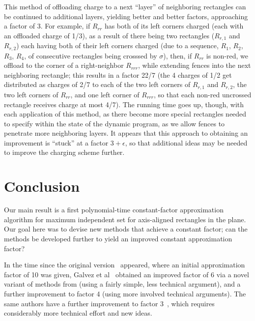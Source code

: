 \documentclass{article}
\begin{document}
This method of offloading charge to a next ``layer'' of neighboring
rectangles can be continued to additional layers, yielding better and
better factors, approaching a factor of 3. For example, if $R_{rr}$
has both of its left corners charged (each with an offloaded charge of
1/3), as a result of there being two rectangles ($R_{r,1}$ and
$R_{r,2}$) each having both of their left corners charged (due to a
sequence, $R_1$, $R_2$, $R_3$, $R_4$, of consecutive rectangles being
crosssed by $\sigma$), then, if $R_{rr}$ is non-red, we offload to the
corner of a right-neighbor $R_{rrr}$, while extending fences into the
next neighboring rectangle; this results in a factor 22/7 (the 4
charges of 1/2 get distributed as charges of 2/7 to each of the two
left corners of $R_{r,1}$ and $R_{r,2}$, the two left corners of
$R_{rr}$, and one left corner of $R_{rrr}$, so that each non-red
uncrossed rectangle receives charge at most 4/7). The running time
goes up, though, with each application of this method, as there become
more special rectangles needed to specify within the state of the
dynamic program, as we allow fences to penetrate more neighboring
layers. It appears that this approach to obtaining an improvement is
``stuck'' at a factor $3+\epsilon$, so that additional ideas may be
needed to improve the charging scheme further.

\section{Conclusion}

Our main result is a first polynomial-time constant-factor
approximation algorithm for maximum independent set for axis-aligned
rectangles in the plane.  Our goal here was to devise new methods that
achieve a constant factor; can the methods be developed further to
yield an improved constant approximation factor?

In the time since the original
version~\cite{DBLP:journals/corr/abs-2101-00326} appeared, where an
initial approximation factor of 10 was given, Galvez et
al~\cite{galvez20214approximation} obtained an improved factor of 6
via a novel variant of methods from
\cite{DBLP:journals/corr/abs-2101-00326} (using a fairly simple, less
technical argument), and a further improvement to factor 4 (using more
involved technical arguments). The same authors have a further
  improvement to factor 3~\cite{galvez2021-3approximation}, which
  requires considerably more technical effort and new ideas.
%
%
\end{document}
